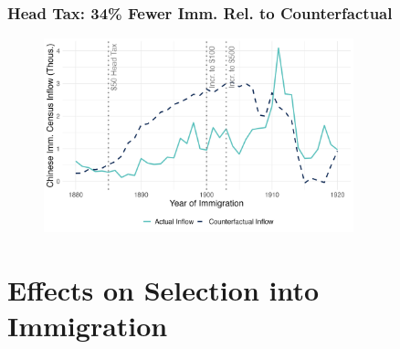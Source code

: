 \documentclass[xcolor=dvipsnames, compress, 12pt, aspectratio=169, handout]{beamer}
\begin{document}
\begin{frame}
    \label{cf_graph_cen}
    \frametitle{Head Tax: 34\% Fewer Imm. Rel. to Counterfactual}
    \centering
    \begin{figure}
        \includegraphics[width = 0.8\textwidth]{../../figs/slides/immflow_counterfactual_cen.png}
    \end{figure}
\end{frame}

\section{Effects on Selection into Immigration}
\end{document}
